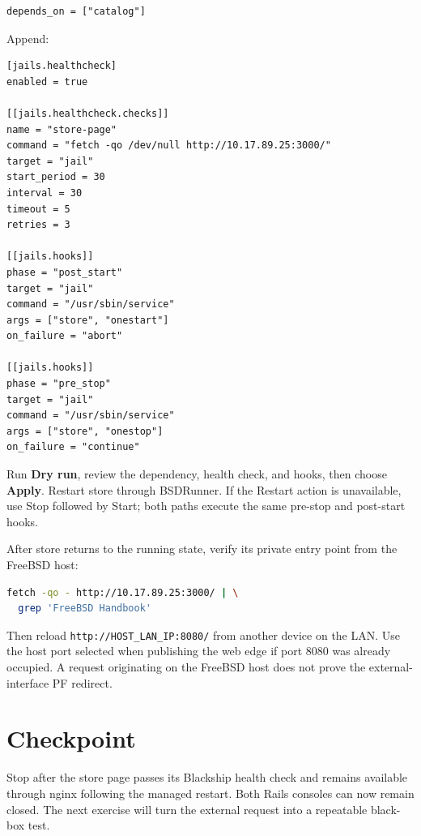 \begin{lstlisting}
depends_on = ["catalog"]
\end{lstlisting}

Append:

\begin{lstlisting}
[jails.healthcheck]
enabled = true

[[jails.healthcheck.checks]]
name = "store-page"
command = "fetch -qo /dev/null http://10.17.89.25:3000/"
target = "jail"
start_period = 30
interval = 30
timeout = 5
retries = 3

[[jails.hooks]]
phase = "post_start"
target = "jail"
command = "/usr/sbin/service"
args = ["store", "onestart"]
on_failure = "abort"

[[jails.hooks]]
phase = "pre_stop"
target = "jail"
command = "/usr/sbin/service"
args = ["store", "onestop"]
on_failure = "continue"
\end{lstlisting}

Run \textbf{Dry run}, review the dependency, health check, and hooks, then
choose \textbf{Apply}. Restart store through BSDRunner. If the Restart action
is unavailable, use Stop followed by Start; both paths execute the same
pre-stop and post-start hooks.

After store returns to the running state, verify its private entry point from
the FreeBSD host:

\begin{lstlisting}[language=sh]
fetch -qo - http://10.17.89.25:3000/ | \
  grep 'FreeBSD Handbook'
\end{lstlisting}

Then reload \texttt{http://HOST\_LAN\_IP:8080/} from another device on the
LAN. Use the host port selected when publishing the web edge if port 8080 was
already occupied. A request originating on the FreeBSD host does not prove the
external-interface PF redirect.

\section{Checkpoint}

Stop after the store page passes its Blackship health check and remains
available through nginx following the managed restart. Both Rails consoles can
now remain closed. The next exercise will turn the external request into a
repeatable black-box test.
